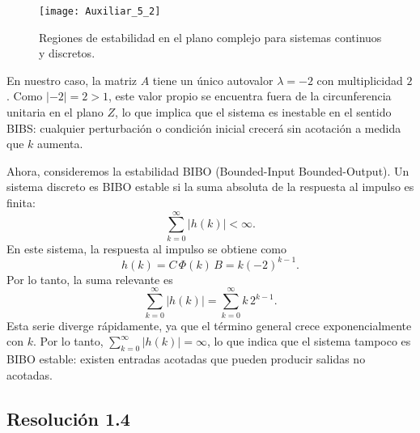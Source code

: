 \documentclass[
  11pt,
  letterpaper,
   addpoints,
  answers
  ]{exam}
\begin{document}
\begin{questions}
\begin{solution}
\begin{figure}[H]
    \centering
    \texttt{[image: Auxiliar\_5\_2]}
    \caption{Regiones de estabilidad en el plano complejo para sistemas continuos y discretos.}
    \label{fig:stability_regions}
\end{figure}
En nuestro caso, la matriz $A$ tiene un único autovalor $\lambda = -2$ con multiplicidad $2$. Como $|-2| = 2 > 1$, este valor propio se encuentra fuera de la circunferencia unitaria en el plano $Z$, lo que implica que el sistema es inestable en el sentido BIBS: cualquier perturbación o condición inicial crecerá sin acotación a medida que $k$ aumenta.

Ahora, consideremos la estabilidad BIBO (Bounded-Input Bounded-Output). Un sistema discreto es BIBO estable si la suma absoluta de la respuesta al impulso es finita:
\begin{equation}
\sum_{k=0}^{\infty} |h(k)| < \infty.
\end{equation}
En este sistema, la respuesta al impulso se obtiene como
\begin{equation}
h(k) = C\,\Phi(k)\,B = k(-2)^{k-1}.
\end{equation}
Por lo tanto, la suma relevante es
\begin{equation}
\sum_{k=0}^{\infty} |h(k)| = \sum_{k=0}^{\infty} k\,2^{k-1}.
\end{equation}
Esta serie diverge rápidamente, ya que el término general crece exponencialmente con $k$. Por lo tanto, $\sum_{k=0}^{\infty} |h(k)| = \infty$, lo que indica que el sistema tampoco es BIBO estable: existen entradas acotadas que pueden producir salidas no acotadas.\\

\begin{center}
\end{center}
\subsection*{Resolución 1.4}


\end{solution}
\end{questions}
\end{document}
